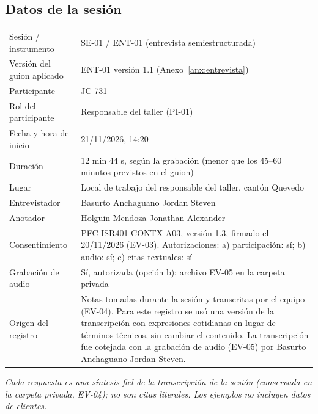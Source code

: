 
\subsection*{Datos de la sesi\'on}
\noindent\begin{tabularx}{\linewidth}{@{}L{4.6cm}Y@{}}
  \toprule
  Sesi\'on / instrumento & SE-01 / ENT-01 (entrevista semiestructurada) \\
  Versi\'on del guion aplicado & ENT-01 versi\'on 1.1 (Anexo~\ref{anx:entrevista}) \\
  Participante & JC-731 \\
  Rol del participante & Responsable del taller (PI-01) \\
  Fecha y hora de inicio & 21/11/2026, 14:20 \\
  Duraci\'on & 12 min 44 s, seg\'un la grabaci\'on (menor que los 45--60 minutos previstos en el guion) \\
  Lugar & Local de trabajo del responsable del taller, cant\'on Quevedo \\
  Entrevistador & Basurto Anchaguano Jordan Steven \\
  Anotador & Holguin Mendoza Jonathan Alexander \\
  Consentimiento & PFC-ISR401-CONTX-A03, versi\'on 1.3, firmado el 20/11/2026 (EV-03). Autorizaciones: a) participaci\'on: s\'i; b) audio: s\'i; c) citas textuales: s\'i \\
  Grabaci\'on de audio & S\'i, autorizada (opci\'on b); archivo EV-05 en la carpeta privada \\
  Origen del registro & Notas tomadas durante la sesi\'on y transcritas por el equipo (EV-04). Para este registro se us\'o una versi\'on de la transcripci\'on con expresiones cotidianas en lugar de t\'erminos t\'ecnicos, sin cambiar el contenido. La transcripci\'on fue cotejada con la grabaci\'on de audio (EV-05) por Basurto Anchaguano Jordan Steven. \\
  \bottomrule
\end{tabularx}

\medskip
\noindent\textit{Cada respuesta es una s\'intesis fiel de la transcripci\'on de la sesi\'on
(conservada en la carpeta privada, EV-04); no son citas literales. Los ejemplos no incluyen datos
de clientes.}

